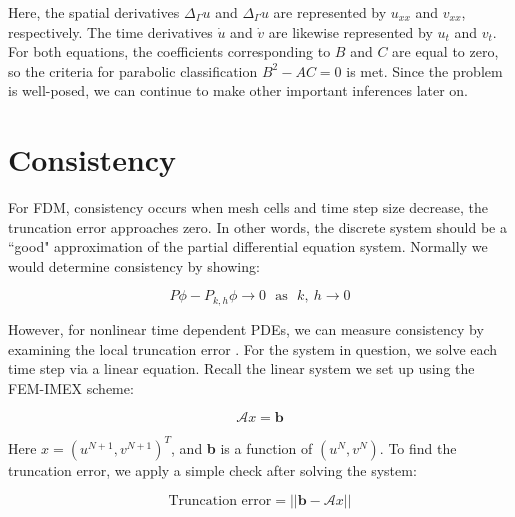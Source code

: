\documentclass[12pt]{article}
\begin{document}
Here, the spatial derivatives $\Delta_\Gamma u$ and $\Delta_\Gamma u$ are represented by $u_{xx}$ and $v_{xx}$, respectively. The time derivatives $\dot{u}$ and $\dot{v}$ are likewise represented by $u_t$ and $v_t$. For both equations, the coefficients corresponding to $B$ and $C$ are equal to zero, so the criteria for parabolic classification $B^2-AC=0$ is met. Since the problem is well-posed, we can continue to make other important inferences later on.


























\section{Consistency}

For FDM, consistency occurs when mesh cells and time step size decrease, the truncation error approaches zero. In other words, the discrete system should be a ``good" approximation of the partial differential equation system. Normally we would determine consistency by showing:

\begin{equation}
	P\phi - P_{k,h}\phi \rightarrow 0 ~~~\text{as} ~~~ k,~h \rightarrow 0
\end{equation}

However, for nonlinear time dependent PDEs, we can measure consistency by examining the local truncation error \cite{Bonito2010}. For the system in question, we solve each time step via a linear equation. Recall the linear system we set up using the FEM-IMEX scheme:

\begin{equation}
	\mathcal{A}x=\textbf{b}
\end{equation}

\noindent Here $x=(u^{N+1}, v^{N+1})^T$, and \textbf{b} is a function of $(u^N, v^N)$. To find the truncation error, we apply a simple check after solving the system:

\begin{equation}\label{norm}
	\text{Truncation error} = ||\textbf{b}-\mathcal{A}x|| 
\end{equation}
\end{document}
